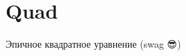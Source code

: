 \chapter{Quad}
\hypertarget{md__r_e_a_d_m_e}{}\label{md__r_e_a_d_m_e}
\label{md__r_e_a_d_m_e_autotoc_md0}%
%
Эпичное квадратное уравнение (swag 😎) 